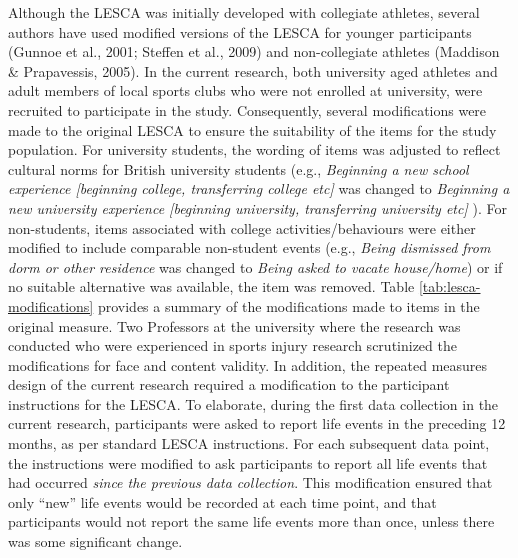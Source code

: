 \documentclass[
  english,
  man,floatsintext]{apa6}
\begin{document}
Although the LESCA was initially developed with collegiate athletes, several authors have used modified versions of the LESCA for younger participants (Gunnoe et al., 2001; Steffen et al., 2009) and non-collegiate athletes (Maddison \& Prapavessis, 2005).
In the current research, both university aged athletes and adult members of local sports clubs who were not enrolled at university, were recruited to participate in the study.
Consequently, several modifications were made to the original LESCA to ensure the suitability of the items for the study population.
For university students, the wording of items was adjusted to reflect cultural norms for British university students (e.g., \emph{Beginning a new school experience {[}beginning college, transferring college etc{]}} was changed to \emph{Beginning a new university experience {[}beginning university, transferring university etc{]}} ).
For non-students, items associated with college activities/behaviours were either modified to include comparable non-student events (e.g., \emph{Being dismissed from dorm or other residence} was changed to \emph{Being asked to vacate house/home}) or if no suitable alternative was available, the item was removed.
Table \ref{tab:lesca-modifications} provides a summary of the modifications made to items in the original measure.
Two Professors at the university where the research was conducted who were experienced in sports injury research scrutinized the modifications for face and content validity.
In addition, the repeated measures design of the current research required a modification to the participant instructions for the LESCA.
To elaborate, during the first data collection in the current research, participants were asked to report life events in the preceding 12 months, as per standard LESCA instructions.
For each subsequent data point, the instructions were modified to ask participants to report all life events that had occurred \emph{since the previous data collection}.
This modification ensured that only \enquote{new} life events would be recorded at each time point, and that participants would not report the same life events more than once, unless there was some significant change.
\end{document}
